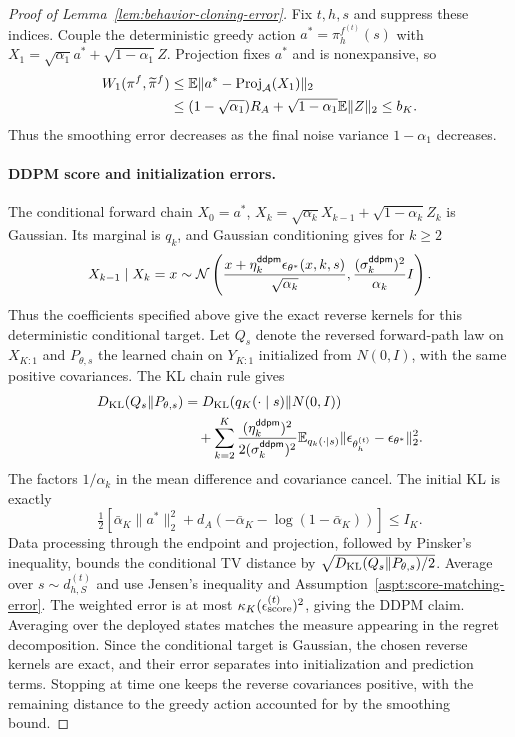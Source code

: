 \begin{proof}[Proof of Lemma~\ref{lem:behavior-cloning-error}]
Fix $t,h,s$ and suppress these indices. Couple the deterministic greedy action $a^*=\pi_h^{f^{(t)}}(s)$ with $X_1=\sqrt{\alpha_1}a^*+\sqrt{1-\alpha_1}Z$. Projection fixes $a^*$ and is nonexpansive, so
\begin{align}
 W_1(\pi^f,\widetilde\pi^f)&\le\mathbb{E}\|a^*-\operatorname{Proj}_{{\mathcal{A}}}(X_1)\|_2\nonumber\\
 &\le(1-\sqrt{\alpha_1})R_A+\sqrt{1-\alpha_1}\mathbb{E}\|Z\|_2\le b_K.\label{eq:w1}
\end{align}
Thus the smoothing error decreases as the final noise variance $1-\alpha_1$ decreases.

\paragraph{DDPM score and initialization errors.}
The conditional forward chain $X_0=a^*$, $X_k=\sqrt{\alpha_k}X_{k-1}+\sqrt{1-\alpha_k}Z_k$ is Gaussian. Its marginal is $q_k$, and Gaussian conditioning gives for $k\ge2$
\[
 X_{k-1}\mid X_k=x\sim{\mathcal{N}}\left(\frac{x+\eta_k^{\mathsf{ddpm}}\epsilon_{\theta^*}(x,k,s)}{\sqrt{\alpha_k}},
                       \frac{(\sigma_k^{\mathsf{ddpm}})^2}{\alpha_k}I\right).
\]
Thus the coefficients specified above give the exact reverse kernels for this deterministic conditional target. Let $Q_s$ denote the reversed forward-path law on $X_{K:1}$ and $P_{\theta,s}$ the learned chain on $Y_{K:1}$ initialized from $N(0,I)$, with the same positive covariances. The KL chain rule gives
\begin{align}
 D_{\mathrm{KL}}(Q_s\Vert P_{\theta,s})
 &=D_{\mathrm{KL}}(q_K(\cdot\mid s)\Vert N(0,I))\nonumber\\
 &\quad+\sum_{k=2}^K\frac{(\eta_k^{\mathsf{ddpm}})^2}{2(\sigma_k^{\mathsf{ddpm}})^2}
 \mathbb{E}_{q_k(\cdot\mid s)}\|\epsilon_{\theta_h^{(t)}}-\epsilon_{\theta^*}\|_2^2.\label{eq:score-error-KL-TV}
\end{align}
The factors $1/\alpha_k$ in the mean difference and covariance cancel. The initial KL is exactly
\[
 \tfrac12[\bar\alpha_K\|a^*\|_2^2+d_A(-\bar\alpha_K-\log(1-\bar\alpha_K))]\le I_K.
\]
Data processing through the endpoint and projection, followed by Pinsker's inequality, bounds the conditional TV distance by $\sqrt{D_{\mathrm{KL}}(Q_s\Vert P_{\theta,s})/2}$. Average over $s\sim d_{h,S}^{(t)}$ and use Jensen's inequality and Assumption~\ref{aspt:score-matching-error}. The weighted error is at most $\kappa_K(\epsilon_{\text{score}}^{(t)})^2$, giving the DDPM claim. Averaging over the deployed states matches the measure appearing in the regret decomposition. Since the conditional target is Gaussian, the chosen reverse kernels are exact, and their error separates into initialization and prediction terms. Stopping at time one keeps the reverse covariances positive, with the remaining distance to the greedy action accounted for by the smoothing bound.


\end{proof}
